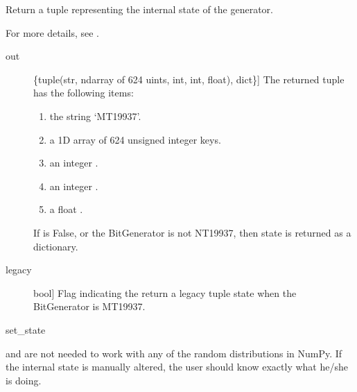 \documentclass[letterpaper,10pt,english]{sphinxmanual}
\begin{document}
\begin{fulllineitems}
\label{\detokenize{infrapy.utils:infrapy.utils.ref2sac.get_state}}
Return a tuple representing the internal state of the generator.

For more details, see .
\begin{description}
\item[{out}] \leavevmode{[}\{tuple(str, ndarray of 624 uints, int, int, float), dict\}{]}
The returned tuple has the following items:
\begin{enumerate}
%
\item {} 
the string ‘MT19937’.

\item {} 
a 1\sphinxhyphen{}D array of 624 unsigned integer keys.

\item {} 
an integer .

\item {} 
an integer .

\item {} 
a float .

\end{enumerate}

If  is False, or the BitGenerator is not NT19937, then
state is returned as a dictionary.

\item[{legacy}] \leavevmode{[}bool{]}
Flag indicating the return a legacy tuple state when the BitGenerator
is MT19937.

\end{description}

set\_state

 and  are not needed to work with any of the
random distributions in NumPy. If the internal state is manually altered,
the user should know exactly what he/she is doing.

\end{fulllineitems}

\end{document}
